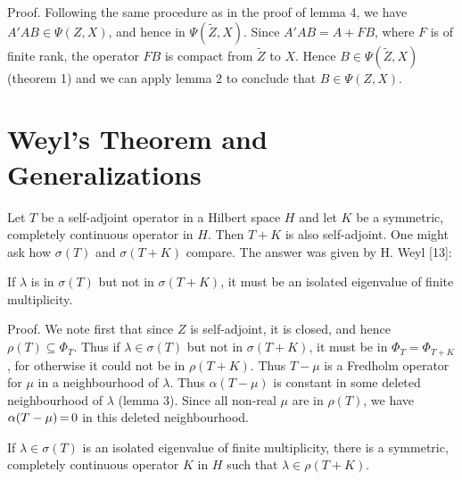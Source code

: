 \documentclass[11pt,twoside]{article}
\begin{document}
Proof.
Following the same procedure as in the proof of lemma 4,
we have $A'AB \in \Psi(Z,X)$, and hence in $\Psi(\tilde{Z},X)$.
Since $A'AB = A+FB$,
where $F$ is of finite rank,
the operator $FB$ is compact from $\tilde{Z}$ to $X$.
Hence $B \in \Psi(\tilde{Z},X)$ (theorem 1)
and we can apply lemma 2 to conclude that $B \in \Psi(Z,X)$.

\section{Weyl's Theorem and Generalizations}                                   %
Let $T$ be a self-adjoint operator in a Hilbert space $H$
and let $K$ be a symmetric, completely continuous operator in $H$.
Then $T+K$ is also self-adjoint.
One might ask how $\sigma(T)$ and $\sigma(T+K)$ compare.
The answer was given by H. Weyl [13]:

\begin{theorem1} %
If $\lambda$ is in $\sigma(T)$ but not in $\sigma(T+K)$,
it must be an isolated eigenvalue of finite multiplicity.
\end{theorem1}

Proof.
We note first that since $Z$ is self-adjoint,
it is closed, and hence $\rho(T) \subseteq \Phi_T$.
Thus if $\lambda \in \sigma(T)$ but not in $\sigma(T+K)$,
it must be in $\Phi_T = \Phi_{T+K}$,
for otherwise it could not be in $\rho(T+K)$.
Thus $T - \mu$ is a Fredholm operator for $\mu$ in a neighbourhood of $\lambda$.
Thus $\alpha(T-\mu)$ is constant in some deleted neighbourhood of $\lambda$
(lemma 3).
Since all non-real $\mu$ are in $\rho(T)$,
we have $\alpha(T-\mu) {\,=\,} 0$ in this deleted neighbourhood.

\begin{theorem1} %
If $\lambda \in \sigma(T)$ is an isolated eigenvalue
of finite multiplicity,
there is a symmetric, completely continuous operator $K$ in $H$
such that $\lambda \in \rho(T+K)$.
\end{theorem1}
\end{document}

